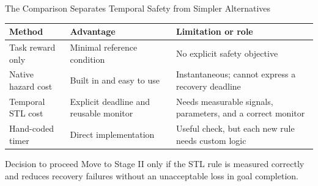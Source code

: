 \documentclass[aspectratio=169]{beamer}
\begin{document}
\begin{frame}{The Comparison Separates Temporal Safety from Simpler Alternatives}
\small
\begin{tabular}{L{2.55cm} L{3.75cm} L{5.2cm}}
\toprule
\textbf{Method} & \textbf{Advantage} & \textbf{Limitation or role} \\
\midrule
Task reward only & Minimal reference condition & No explicit safety objective \\
\addlinespace
Native hazard cost & Built in and easy to use & Instantaneous; cannot express a recovery deadline \\
\addlinespace
Temporal STL cost & Explicit deadline and reusable monitor & Needs measurable signals, parameters, and a correct monitor \\
\addlinespace
Hand-coded timer & Direct implementation & Useful check, but each new rule needs custom logic \\
\bottomrule
\end{tabular}

\vspace{0.75em}
\begin{block}{Decision to proceed}
\normalsize
Move to Stage II only if the STL rule is measured correctly and reduces recovery failures without an unacceptable loss in goal completion.
\end{block}
\end{frame}
\end{document}
